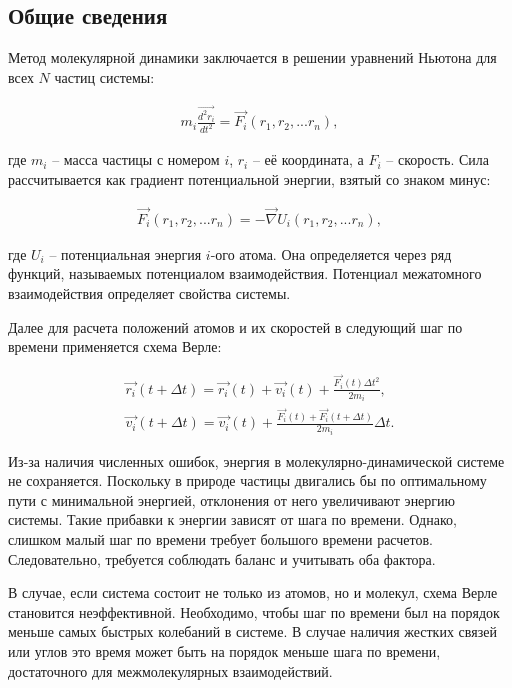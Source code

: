 \subsection{Общие сведения}

Метод молекулярной динамики заключается в решении уравнений Ньютона для всех $N$ частиц системы:

\begin{align}
	m_i\frac{\overrightarrow{d^2r_i}}{dt^2} = \overrightarrow{F_i}(r_1, r_2, ... r_n),
\end{align}

где $m_i$ \--- масса частицы с номером $i$, $r_i$ \--- её координата, а $F_i$ \--- скорость. Сила рассчитывается как  градиент потенциальной энергии, взятый со знаком минус:

\begin{align}
	\overrightarrow{F_i}(r_1, r_2, ... r_n) = -\overrightarrow{\nabla}U_i(r_1, r_2, ... r_n),
\end{align}

где $U_i$ \--- потенциальная энергия $i$-ого атома. Она определяется через ряд функций, называемых потенциалом взаимодействия. Потенциал межатомного взаимодействия определяет свойства системы. 

Далее для расчета положений атомов и их скоростей в следующий шаг по времени применяется схема Верле:

\begin{subequations}
    \begin{gather}
		\overrightarrow{r_i}(t+\Delta t) = \overrightarrow{r_i}(t) + \overrightarrow{v_i}(t) + \frac{\overrightarrow{F_i}(t)\Delta t^2}{2m_i},\\
		\overrightarrow{v_i}(t+\Delta t) = \overrightarrow{v_i}(t) + \frac{\overrightarrow{F_i}(t)+\overrightarrow{F_i}(t+\Delta t)}{2m_i}\Delta t.
    \end{gather}
\end{subequations}

Из-за наличия численных ошибок, энергия в молекулярно-динамической системе не сохраняется. Поскольку в природе частицы двигались бы по оптимальному пути с минимальной энергией, отклонения от него увеличивают энергию системы. Такие прибавки к энергии зависят от шага по времени. Однако, слишком малый шаг по времени требует большого времени расчетов. Следовательно, требуется соблюдать баланс и учитывать оба фактора.

В случае, если система состоит не только из атомов, но и молекул, схема Верле становится неэффективной. Необходимо, чтобы шаг по времени был на порядок меньше самых быстрых колебаний в системе. В случае наличия жестких связей или углов это время может быть на порядок меньше шага по времени, достаточного для межмолекулярных взаимодействий.

